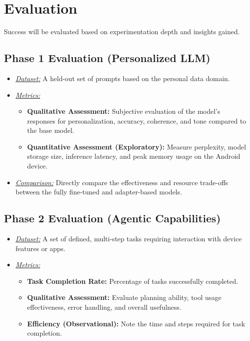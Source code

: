 \documentclass[conference]{IEEEtran}
\begin{document}
\section{Evaluation}
Success will be evaluated based on experimentation depth and insights gained.

\subsection{Phase 1 Evaluation (Personalized LLM)}
\begin{itemize}
    \item \textit{\uline{Dataset:}} A held-out set of prompts based on the personal data domain.
    \item \textit{\uline{Metrics:}}
    \begin{itemize}
        \item \textbf{Qualitative Assessment:} Subjective evaluation of the model's responses for personalization, accuracy, coherence, and tone compared to the base model.
        \item \textbf{Quantitative Assessment (Exploratory):} Measure perplexity, model storage size, inference latency, and peak memory usage on the Android device.
    \end{itemize}
    \item \textit{\uline{Comparison:}} Directly compare the effectiveness and resource trade-offs between the fully fine-tuned and adapter-based models.
\end{itemize}

\subsection{Phase 2 Evaluation (Agentic Capabilities)}
\begin{itemize}
    \item \textit{\uline{Dataset:}} A set of defined, multi-step tasks requiring interaction with device features or apps.
    \item \textit{\uline{Metrics:}}
    \begin{itemize}
        \item \textbf{Task Completion Rate:} Percentage of tasks successfully completed.
        \item \textbf{Qualitative Assessment:} Evaluate planning ability, tool usage effectiveness, error handling, and overall usefulness.
        \item \textbf{Efficiency (Observational):} Note the time and steps required for task completion.
    \end{itemize}
\end{itemize}
\end{document}

